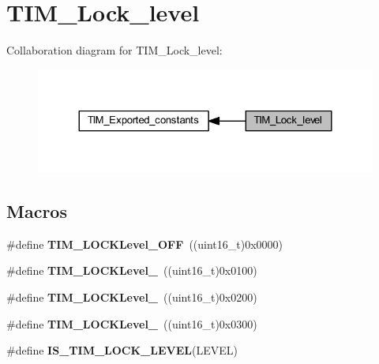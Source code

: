 \hypertarget{group___t_i_m___lock__level}{}\section{T\+I\+M\+\_\+\+Lock\+\_\+level}
\label{group___t_i_m___lock__level}
Collaboration diagram for T\+I\+M\+\_\+\+Lock\+\_\+level\+:
\nopagebreak
\begin{figure}[H]
\begin{center}
\leavevmode
\includegraphics[width=324pt]{group___t_i_m___lock__level}
\end{center}
\end{figure}
\subsection*{Macros}
\begin{DoxyCompactItemize}
\item 
\mbox{\label{group___t_i_m___lock__level_ga84d318c62d3e5dfe7082610d03e11f2f}} 
\#define {\bfseries T\+I\+M\+\_\+\+L\+O\+C\+K\+Level\+\_\+\+O\+FF}~((uint16\+\_\+t)0x0000)
\item 
\mbox{\label{group___t_i_m___lock__level_ga7e4326fc7756ebf5e9eb9776c2734aea}} 
\#define {\bfseries T\+I\+M\+\_\+\+L\+O\+C\+K\+Level\+\_}~((uint16\+\_\+t)0x0100)
\item 
\mbox{\label{group___t_i_m___lock__level_ga91bdf218f766e6a10b7a7df407250d25}} 
\#define {\bfseries T\+I\+M\+\_\+\+L\+O\+C\+K\+Level\+\_}~((uint16\+\_\+t)0x0200)
\item 
\mbox{\label{group___t_i_m___lock__level_gaa0a0c1ffd9dc582d6571780c1747920b}} 
\#define {\bfseries T\+I\+M\+\_\+\+L\+O\+C\+K\+Level\+\_}~((uint16\+\_\+t)0x0300)
\item 
\#define {\bfseries I\+S\+\_\+\+T\+I\+M\+\_\+\+L\+O\+C\+K\+\_\+\+L\+E\+V\+EL}(L\+E\+V\+EL)
\end{DoxyCompactItemize}


